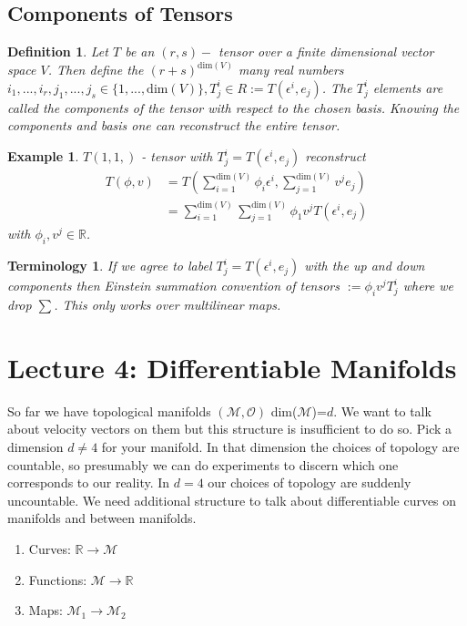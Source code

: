 \documentclass[10pt, oneside]{article}
\newcommand{\R}{\mathbb{R}}
\newcommand{\M}{\mathcal{M}}
\newtheorem{defn}{Definition}
\newtheorem{example}{Example}
\newtheorem{Terminology}{Terminology}
\begin{document}
     \subsection*{Components of Tensors}
        \begin{defn}
           Let $T$ be an $(r,s) - $ tensor over a finite dimensional vector space $V$. Then define the $(r+s)^{\text{dim}(V)}$ many real numbers $i_1,...,i_r, j_1,...,j_s \in \{1,...,\text{dim}(V)\}, T^i_j \in R := T(\epsilon^i,e_j)$. The $T^i_j$ elements are called the components of the tensor with respect to the chosen basis.
           Knowing the components and basis one can reconstruct the entire tensor.
        \end{defn}
        \begin{example}
           $T (1,1,)$ - tensor with $T^i_j = T(\epsilon^i,e_j)$ reconstruct
           \begin{align*}
              T(\phi,v) &= T(\sum_{i=1}^{\text{dim}(V)}\phi_i \epsilon^i, \sum_{j=1}^{\text{dim}(V)}v^j e_j) \\
              &=\sum_{i=1}^{\text{dim}(V)}\sum_{j=1}^{\text{dim}(V)} \phi_1 v^j T(\epsilon^i,e_j)
           \end{align*}
           with $\phi_i, v^j \in \R$.
        \end{example}
        \begin{Terminology}
           If we agree to label $T^i_j = T(\epsilon^i,e_j)$ with the up and down components then Einstein summation convention of tensors $:= \phi_i v^j T^i_j$ where we drop $\sum$. This only works over multilinear maps.
        \end{Terminology}
\section*{Lecture 4: Differentiable Manifolds}
  So far we have topological manifolds $(\M,\mathcal{O})$ dim($\M$)=$d$. We want to talk about velocity vectors on them but this structure is insufficient to do so.
  Pick a dimension $d \neq 4$ for your manifold. In that dimension the choices of topology are countable, so presumably we can do experiments to discern which one corresponds to our reality.
  In $d=4$ our choices of topology are suddenly uncountable. We need additional structure to talk about differentiable curves on manifolds and between manifolds.
  \begin{enumerate}
     \item Curves: $\R \to \M$
     \item Functions: $\M \to \R$
     \item Maps: $\M_1 \to \M_2$
  \end{enumerate}
\end{document}
